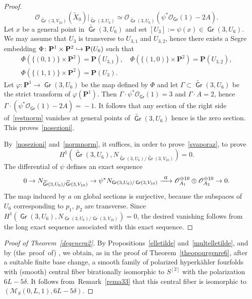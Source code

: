 \documentclass[11pt]{article}
\let\mathcal\mathscr
\newcommand\hto{\mathrel{\lhook\joinrel\to}}
\newcommand\To[1]{\mathchoice{\xrightarrow{\textstyle\kern4pt#1\kern3pt}}{\stackrel{#1}{\longrightarrow}}{}{}}
\theoremstyle{definition}
\renewcommand\P{{\mathbf P}}\let\PP\P
\newcommand\cM{\mathcal{M}}
\newcommand\cO{\mathcal{O}}\let\OO\cO
\DeclareMathOperator{\Gr}{\mathsf{Gr}}
\let\isom\simeq
\let\phi\varphi
\let\wt\widetilde
\let\Ld L
\newcommand\hilbS{S^{[2]}}
\newcommand\hk{hyperkähler\xspace}
\begin{document}
\begin{proof}
\begin{equation}\label{restnorm}
\cO_{\wt{\Gr}(3,V_{10})}(\wt{X}_0)\vert_{\wt{\Gr}(3,U_6)}\isom \cO_{\wt{\Gr}(3,U_6)}(\psi^{*}\cO_{\Gr}(1)-2A).
\end{equation}
Let $x$ be a general point in $ \wt{\Gr}(3,U_6)$
and set $[U_3]:=\psi(x)\in \Gr(3,U_6)$. We may assume that $U_3$ is transverse to $U_{3,1} $ and $U_{3,2} $, hence there exists a Segre embedding $\Phi\colon\PP^1\times\PP^2\hto\PP(U_6)$ such that\vspace*{-3pt}
\begin{gather*}
\Phi(\{(0,1)\}\times \P^2)=\P(U_{3,1}),\quad
\Phi(\{(1,0)\}\times \P^2)=\P(U_{3,2} ),\\
\Phi(\{(1,1)\}\times \P^2)= \PP(U_3).
\end{gather*}
Let $\phi\colon\PP^1\to\Gr(3,U_6)$ be the map defined by $\Phi$ and let $\Gamma\subset\wt{\Gr}(3,U_6)$ be the strict transform of $\phi(\PP^1)$. Then $\Gamma\cdot\psi^{*}\cO_{\Gr}(1)\!=\!3$ and
$\Gamma\cdot A\!=\!2$, hence \hbox{$\Gamma\cdot(\psi^{*}\cO_{\Gr}(1)\!-\!2A)\!=\!-1$}. It follows that any section of the right side of~\eqref{restnorm} vanishes at general points of $\wt{\Gr}(3,U_6)$ hence is the zero section.
This proves~\eqref{nosezioni}.

By~\eqref{nosezioni} and~\eqref{normnorm}, it suffices, in order to prove~\eqref{svaporaz}, to prove\vspace*{-3pt}
\[
H^1(\wt{\Gr}(3,U_6), N_{\wt{\Gr}(3,U_6)/\wt{\Gr}(3,V_{10})})= 0.
\]
The differential of $\psi$ defines an exact sequence\vspace*{-3pt}
\[
0\to N_{\wt{\Gr}(3,U_6)/\wt{\Gr}(3,V_{10})} \to \psi^{*}N_{\Gr(3,U_6)/\Gr(3,V_{10})} \To{a} \cO^{\oplus 10}_{A_1}\oplus\cO^{\oplus 10}_{A_2} \to 0.
\]
The map induced by $a$ on global sections is surjective, because the subspaces of $U_6$ corresponding to $p_1$, $p_2$ are transverse. Since $H^1(\Gr(3,U_6),N_{\Gr(3,U_6)/\Gr(3,V_{10})})=0$, the desired vanishing follows from the long exact sequence associated with this exact sequence.
\end{proof}

\begin{proof}[Proof of Theorem~\ref{degenera2}]
By Propositions~\ref{elletilde} and~\ref{multelletilde}, and by (the~proof~of) \cite[Th.\,(0.1)]{KLSV}, we obtain, as in the proof of Theorem~\ref{theopourgenre6},
after a suitable finite base change, a smooth family of polarized \hk fourfolds with (smooth) central fiber birationally isomorphic to $\hilbS$ with the polarization $6L-5\delta$. It follows from~Remark~\ref{rema33} that this central fiber is isomorphic to $(\cM_S(0,L,1),6\Ld-5\delta)$.
\end{proof}
\end{document}
